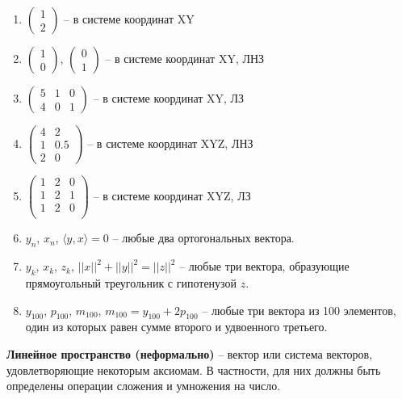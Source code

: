 \documentclass[11pt, a4paper]{extarticle}
\begin{document}
		\begin{multicols}{2}
		\begin{enumerate}[label=\alph*)]
			\item $\begin{pmatrix}
			1 \\
			2
			\end{pmatrix}$ – в системе координат XY
			\item $\begin{pmatrix}
			1 \\
			0
			\end{pmatrix}$, 
			$\begin{pmatrix}
			0 \\
			1
			\end{pmatrix}$ – в системе координат XY, ЛНЗ
			\item$\begin{pmatrix}
			5 & 1 & 0 \\
			4 & 0 & 1
			\end{pmatrix}$ – в системе координат XY, ЛЗ
			\item $\begin{pmatrix}
			4 & 2 \\
			1 & 0.5 \\
			2 & 0
			\end{pmatrix}$ – в системе координат XYZ, ЛНЗ
			\item $\begin{pmatrix}
			1 & 2 & 0 \\
			1 & 2 & 1 \\
			1 & 2 & 0 \\
			\end{pmatrix}$ – в системе координат XYZ, ЛЗ
			\item $y_n$, $x_n$, $\langle y, x \rangle = 0$ – любые два ортогональных вектора.
			\item $y_k$, $x_k$, $z_k$, $||x||^2 + ||y||^2 = ||z||^2$ – любые три вектора, образующие прямоугольный треугольник с гипотенузой $z$.
			\item $y_{100}$, $p_{100}$, $m_{100}$, $m_{100} = y_{100} + 2p_{100}$ – любые три вектора из 100 элементов, один из которых равен сумме второго и удвоенного третьего.
		\end{enumerate}
	\end{multicols}
	
	\textbf{Линейное пространство (неформально)} – вектор или система векторов, удовлетворяющие некоторым аксиомам. В частности, для них должны быть определены операции сложения и умножения на число.
	
\end{document}
